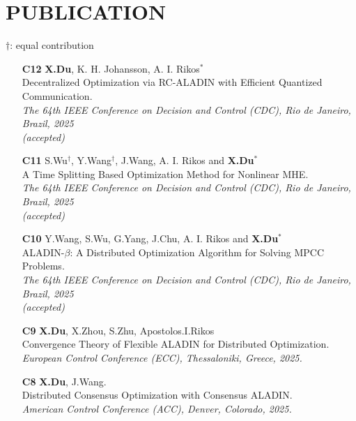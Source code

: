 \documentclass[paper=a4,fontsize=11pt]{scrartcl} %
\newcommand{\NewPart}[1]{\section*{\uppercase{#1}}}
\newcommand{\EducationEntry}[4]{
	\noindent \textbf{#1} \hfill      %
	\colorbox{White}{%
		\parbox{5cm}{%
			\hfill\color{Black}#2}} \par  %
	\noindent \textit{#3} \par        %
	\noindent\hangindent=2em\hangafter=0 \small #4 %
	\normalsize \par}
\begin{document}
		
		\NewPart{PUBLICATION}{}
		$\dag$:  equal contribution
		\begin{itemize}
			
					\item [\textbf{C12}] {\textbf{X.Du}, K. H. Johansson,  A. I. Rikos$^*$ \\
				{Decentralized Optimization via RC-ALADIN with Efficient Quantized Communication.}\\
				\emph{The 64th IEEE Conference on Decision and Control (CDC), Rio de Janeiro, Brazil, 2025\\(accepted)
			} }
			
			\item [\textbf{C11}] {S.Wu$^\dagger$, Y.Wang$^\dagger$, J.Wang, A. I. Rikos and \textbf{X.Du}$^*$ \\
				{A Time Splitting Based Optimization Method for Nonlinear MHE.}\\
				\emph{The 64th IEEE Conference on Decision and Control (CDC), Rio de Janeiro, Brazil, 2025\\(accepted)
			} }
			
			\item [\textbf{C10}] {Y.Wang, S.Wu, G.Yang, J.Chu, A. I. Rikos and \textbf{X.Du}$^*$ \\
				{ALADIN-$\beta$: A Distributed Optimization Algorithm for Solving MPCC Problems.}\\
				\emph{The 64th IEEE Conference on Decision and Control (CDC), Rio de Janeiro, Brazil, 2025\\(accepted)
			} }
			
		
			
			\item [\textbf{C9}]   {\textbf{X.Du}, X.Zhou, S.Zhu, Apostolos.I.Rikos \\
				{ Convergence Theory of Flexible ALADIN for Distributed Optimization.}\\
				\emph{European Control Conference (ECC), Thessaloniki, Greece, 2025.
			} }
			
			\item [\textbf{C8}]   {\textbf{X.Du}, J.Wang. \\
				{ Distributed Consensus Optimization with Consensus ALADIN.}\\
				\emph{American Control Conference (ACC), Denver, Colorado, 2025.
			} }
			

\end{itemize}
\end{document}
